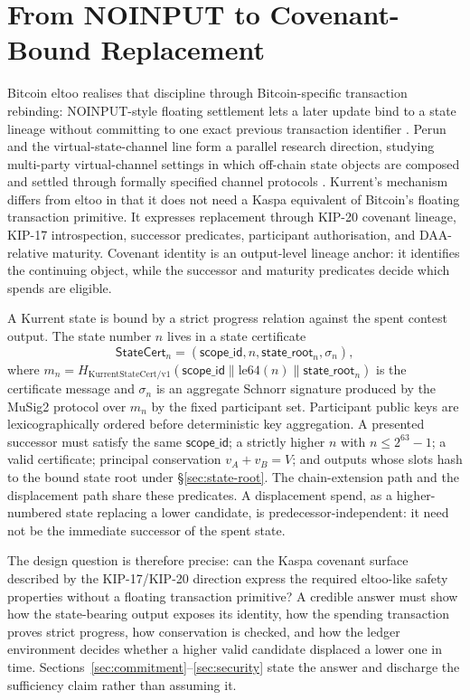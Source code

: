 \documentclass[10pt,a4paper]{article}
\begin{document}
\section{From NOINPUT to Covenant-Bound Replacement}

Bitcoin eltoo realises that discipline through Bitcoin-specific transaction rebinding: NOINPUT-style floating settlement lets a later update bind to a state lineage without committing to one exact previous transaction identifier \cite{eltoo}. Perun and the virtual-state-channel line form a parallel research direction, studying multi-party virtual-channel settings in which off-chain state objects are composed and settled through formally specified channel protocols \cite{perunVSC}. Kurrent's mechanism differs from eltoo in that it does not need a Kaspa equivalent of Bitcoin's floating transaction primitive. It expresses replacement through KIP-20 covenant lineage, KIP-17 introspection, successor predicates, participant authorisation, and DAA-relative maturity. Covenant identity is an output-level lineage anchor: it identifies the continuing object, while the successor and maturity predicates decide which spends are eligible.

A Kurrent state is bound by a strict progress relation against the spent contest output. The state number $n$ lives in a state certificate
\[
  \mathsf{StateCert}_n = (\mathsf{scope\_id}, n, \mathsf{state\_root}_n, \sigma_n),
\]
where $m_n = H_{\mathrm{KurrentStateCert/v1}}(\mathsf{scope\_id} \parallel \mathrm{le64}(n) \parallel \mathsf{state\_root}_n)$ is the certificate message and $\sigma_n$ is an aggregate Schnorr signature produced by the MuSig2 protocol over $m_n$ by the fixed participant set. Participant public keys are lexicographically ordered before deterministic key aggregation. A presented successor must satisfy the same $\mathsf{scope\_id}$; a strictly higher $n$ with $n \le 2^{63}-1$; a valid certificate; principal conservation $v_A + v_B = V$; and outputs whose slots hash to the bound state root under \S\ref{sec:state-root}. The chain-extension path and the displacement path share these predicates. A displacement spend, as a higher-numbered state replacing a lower candidate, is predecessor-independent: it need not be the immediate successor of the spent state.

The design question is therefore precise: can the Kaspa covenant surface described by the KIP-17/KIP-20 direction express the required eltoo-like safety properties without a floating transaction primitive? A credible answer must show how the state-bearing output exposes its identity, how the spending transaction proves strict progress, how conservation is checked, and how the ledger environment decides whether a higher valid candidate displaced a lower one in time. Sections~\ref{sec:commitment}--\ref{sec:security} state the answer and discharge the sufficiency claim rather than assuming it.
\end{document}
